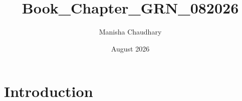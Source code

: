 \documentclass{article}
\title{Book_Chapter_GRN_082026}
\author{Manisha Chaudhary}
\date{August 2026}
\begin{document}
\maketitle

\section{Introduction}
\end{document}
